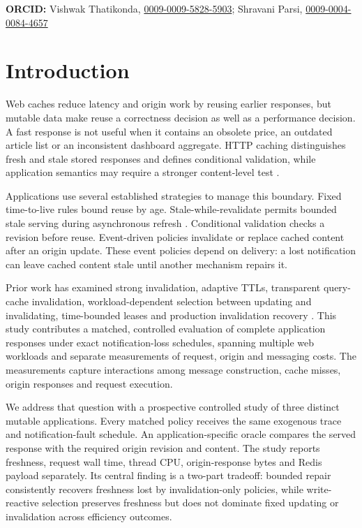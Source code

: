 \documentclass[pdflatex,sn-mathphys-num]{sn-jnl}
\begin{document}
\noindent\textbf{ORCID:} Vishwak Thatikonda, \href{https://orcid.org/0009-0009-5828-5903}{0009-0009-5828-5903}; Shravani Parsi, \href{https://orcid.org/0009-0004-0084-4657}{0009-0004-0084-4657}

\section{Introduction}\label{introduction}

Web caches reduce latency and origin work by reusing earlier responses, but mutable data make reuse a correctness decision as well as a performance decision. A fast response is not useful when it contains an obsolete price, an outdated article list or an inconsistent dashboard aggregate. HTTP caching distinguishes fresh and stale stored responses and defines conditional validation, while application semantics may require a stronger content-level test \citep{rfc9111}.

Applications use several established strategies to manage this boundary. Fixed time-to-live rules bound reuse by age. Stale-while-revalidate permits bounded stale serving during asynchronous refresh \citep{rfc5861}. Conditional validation checks a revision before reuse. Event-driven policies invalidate or replace cached content after an origin update. These event policies depend on delivery: a lost notification can leave cached content stale until another mechanism repairs it.

Prior work has examined strong invalidation, adaptive TTLs, transparent query-cache invalidation, workload-dependent selection between updating and invalidating, time-bounded leases and production invalidation recovery \citep{cao1998strongcache, sazoglu2013ttl, amza2005transparent, mao2024cachefreshness, gray1989leases, nishtala2013memcache}. This study contributes a matched, controlled evaluation of complete application responses under exact notification-loss schedules, spanning multiple web workloads and separate measurements of request, origin and messaging costs. The measurements capture interactions among message construction, cache misses, origin responses and request execution.

We address that question with a prospective controlled study of three distinct mutable applications. Every matched policy receives the same exogenous trace and notification-fault schedule. An application-specific oracle compares the served response with the required origin revision and content. The study reports freshness, request wall time, thread CPU, origin-response bytes and Redis payload separately. Its central finding is a two-part tradeoff: bounded repair consistently recovers freshness lost by invalidation-only policies, while write-reactive selection preserves freshness but does not dominate fixed updating or invalidation across efficiency outcomes.
\end{document}
